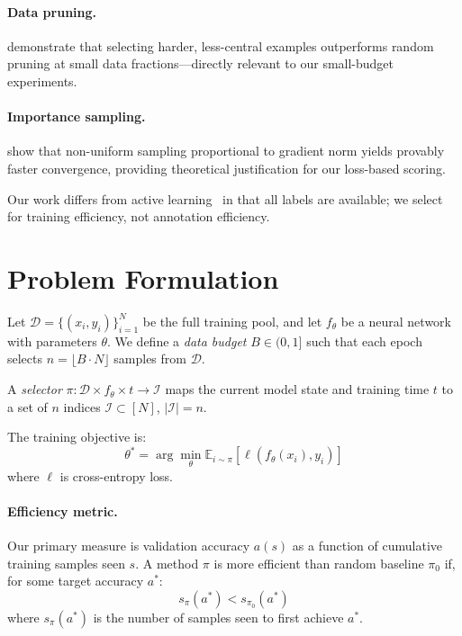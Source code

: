 \documentclass[10pt,twocolumn]{article}
\begin{document}
\paragraph{Data pruning.}
\citet{sorscher2022beyond} demonstrate that selecting harder, less-central
examples outperforms random pruning at small data fractions---directly
relevant to our small-budget experiments.

\paragraph{Importance sampling.}
\citet{zhao2015importance} show that non-uniform sampling proportional to
gradient norm yields provably faster convergence, providing theoretical
justification for our loss-based scoring.

Our work differs from active learning~\citep{settles2009active} in that
all labels are available; we select for training efficiency, not annotation
efficiency.

\section{Problem Formulation}
\label{sec:problem}

Let $\mathcal{D} = \{(x_i, y_i)\}_{i=1}^N$ be the full training pool,
and let $f_\theta$ be a neural network with parameters $\theta$.
We define a \emph{data budget} $B \in (0, 1]$ such that each epoch
selects $n = \lfloor B \cdot N \rfloor$ samples from $\mathcal{D}$.

A \emph{selector} $\pi: \mathcal{D} \times f_\theta \times t \to \mathcal{I}$
maps the current model state and training time $t$ to a set of $n$ indices
$\mathcal{I} \subset [N]$, $|\mathcal{I}| = n$.

The training objective is:
\begin{equation}
  \theta^* = \arg\min_\theta \mathbb{E}_{i \sim \pi} [\ell(f_\theta(x_i), y_i)]
\end{equation}
where $\ell$ is cross-entropy loss.

\paragraph{Efficiency metric.}
Our primary measure is validation accuracy $a(s)$ as a function of
cumulative training samples seen $s$. A method $\pi$ is more efficient
than random baseline $\pi_0$ if, for some target accuracy $a^*$:
\begin{equation}
  s_\pi(a^*) < s_{\pi_0}(a^*)
\end{equation}
where $s_\pi(a^*)$ is the number of samples seen to first achieve $a^*$.
\end{document}
